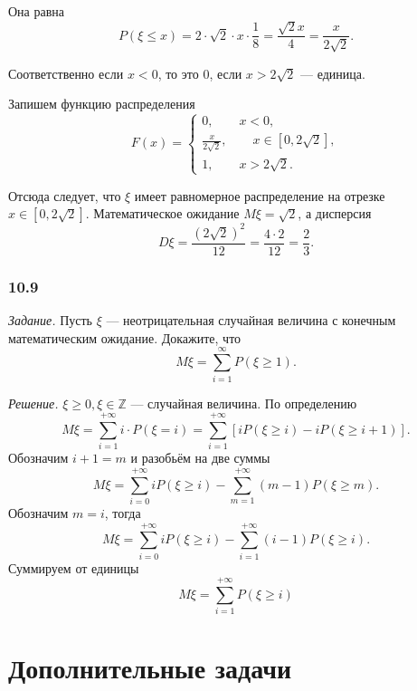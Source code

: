 \begin{enumerate}[label=\alph*)]
Она равна
$$P \left( \xi \leq x \right) =
2 \cdot \sqrt{2} \cdot x \cdot \frac{1}{8} =
\frac{ \sqrt{2} x}{4} =
\frac{x}{2 \sqrt{2}}.$$

Соответственно если $x < 0$, то это 0, если $x > 2 \sqrt{2} $ --- единица.

Запишем функцию распределения
$$F \left( x \right) =
\begin{cases}
0, \qquad x < 0, \\
\frac{x}{2 \sqrt{2}}, \qquad x \in \left[ 0, 2 \sqrt{2} \right], \\
1, \qquad x > 2 \sqrt{2}.
\end{cases}$$

Отсюда следует, что $ \xi $ имеет равномерное распределение на отрезке $x \in \left[0, 2 \sqrt{2} \right] $.
Математическое ожидание $M \xi = \sqrt{2}$, а дисперсия
$$D \xi = \frac{ \left( 2 \sqrt{2} \right)^2}{12} =
\frac{4 \cdot 2}{12} =
\frac{2}{3}.$$
\end{enumerate}

\subsubsection*{10.9}

\textit{Задание.} Пусть $ \xi $ --- неотрицательная случайная величина с конечным математическим ожидание.
Докажите, что
$$M \xi =
\sum \limits_{i=1}^{ \infty } P \left( \xi \geq 1 \right).$$

\textit{Решение.} $ \xi \geq 0, \xi \in \mathbb{Z}$ --- случайная величина.
По определению
$$M \xi =
\sum \limits_{i=1}^{+ \infty } i \cdot P \left( \xi = i \right) =
\sum \limits_{i=1}^{+ \infty } \left[ iP \left( \xi \geq i \right) - iP \left( \xi \geq i + 1 \right) \right].$$
Обозначим $i + 1 = m$ и разобьём на две суммы
$$M \xi =
\sum \limits_{i=0}^{+ \infty } iP \left( \xi \geq i \right) - \sum \limits_{m=1}^{+ \infty } \left( m-1 \right) P \left( \xi \geq m \right).$$
Обозначим $m=i$, тогда
$$M \xi =
\sum \limits_{i=0}^{+ \infty } iP \left( \xi \geq i \right) - \sum \limits_{i=1}^{+ \infty } \left( i-1 \right) P \left( \xi \geq i \right).$$
Суммируем от единицы
$$M \xi =
\sum \limits_{i=1}^{+ \infty } P \left( \xi \geq i \right)$$

\section*{Дополнительные задачи}

